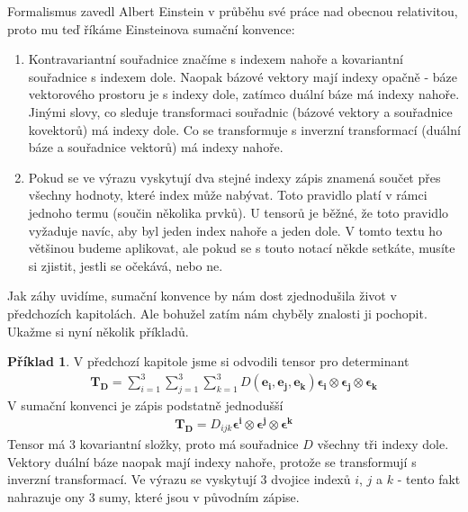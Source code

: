 \documentclass[a5paper,12pt]{amsbook}
\theoremstyle{definition}
\newtheorem{example}{Příklad}[chapter]
\newcommand{\myvec}[1]{\bm{#1}}
\begin{document}
Formalismus zavedl Albert Einstein v průběhu své práce nad obecnou relativitou, proto mu teď
říkáme Einsteinova sumační konvence:
\begin{enumerate}
  \item Kontravariantní souřadnice značíme s indexem nahoře a kovariantní souřadnice s indexem dole.
    Naopak bázové vektory mají indexy opačně - báze vektorového prostoru je s indexy dole, zatímco
    duální báze má indexy nahoře. Jinými slovy, co sleduje transformaci souřadnic (bázové vektory
    a souřadnice kovektorů) má indexy dole. Co se transformuje s inverzní transformací (duální
    báze a souřadnice vektorů) má indexy nahoře.
  \item Pokud se ve výrazu vyskytují dva stejné indexy zápis znamená součet přes všechny hodnoty,
    které index může nabývat. Toto pravidlo platí v rámci jednoho termu (součin několika prvků).
    U tensorů je běžné, že toto pravidlo vyžaduje navíc, aby byl jeden index nahoře a jeden
    dole. V tomto textu ho většinou budeme aplikovat, ale pokud se s touto notací někde setkáte,
    musíte si zjistit, jestli se očekává, nebo ne.
\end{enumerate}
Jak záhy uvidíme, sumační konvence by nám dost zjednodušila život v předchozích kapitolách.
Ale bohužel zatím nám chyběly znalosti ji pochopit. Ukažme si nyní několik příkladů.

\begin{example}
V předchozí kapitole jsme si odvodili tensor pro determinant
\begin{equation*}
\begin{split}
\myvec{T_D} =
\sum_{i=1}^{3}\sum_{j=1}^{3}\sum_{k=1}^{3} D(\myvec{e_i}, \myvec{e_j}, \myvec{e_k})
\myvec{\epsilon_i}\otimes\myvec{\epsilon_j}\otimes\myvec{\epsilon_k}
\end{split}
\end{equation*}
V sumační konvenci je zápis podstatně jednodušší
\begin{equation*}
\begin{split}
\myvec{T_D} = D_{ijk}
  \myvec{\epsilon^i}\otimes\myvec{\epsilon^j}\otimes\myvec{\epsilon^k}
\end{split}
\end{equation*}
Tensor má 3 kovariantní složky, proto má souřadnice $D$ všechny tři indexy dole. Vektory
duální báze naopak mají indexy nahoře, protože se transformují s inverzní transformací.
Ve výrazu se vyskytují 3 dvojice indexů $i$, $j$ a $k$ - tento fakt nahrazuje ony 3 sumy,
které jsou v původním zápise.
\end{example}
\end{document}
